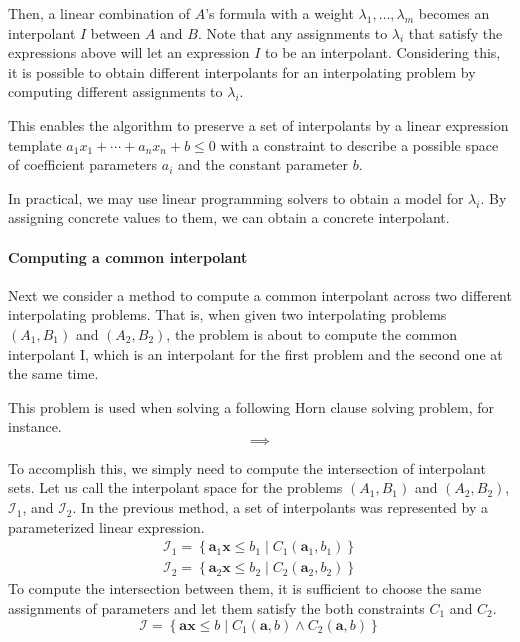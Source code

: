 Then, a linear combination of $A$'s formula with a weight $\lambda_1,
\ldots, \lambda_m$ becomes an interpolant $I$ between $A$ and $B$.
Note that any assignments to $\lambda_i$ that satisfy the expressions
above will let an expression $I$ to be an interpolant.  Considering
this, it is possible to obtain different interpolants for an
interpolating problem by computing different assignments to
$\lambda_i$.

This enables the algorithm to preserve a set of interpolants by a
linear expression template $a_1 x_1 + \cdots + a_n x_n + b \leq 0$
with a constraint to describe a possible space of coefficient
parameters $a_i$ and the constant parameter $b$.

In practical, we may use linear programming solvers to obtain a model
for $\lambda_i$.  By assigning concrete values to them, we can obtain
a concrete interpolant.


\paragraph{Computing a common interpolant}
Next we consider a method to compute a common interpolant across two
different interpolating problems.  That is, when given two
interpolating problems $\left(A_1, B_1 \right)$ and $\left(A_2, B_2
\right)$, the problem is about to compute the common interpolant I,
which is an interpolant for the first problem and the second one at
the same time.

This problem is used when solving a following Horn clause solving
problem, for instance.
\[
\implies
\]

To accomplish this, we simply need to compute the intersection of
interpolant sets.  Let us call the interpolant space for the problems
$\left(A_1, B_1 \right)$ and $\left(A_2, B_2 \right)$,
$\mathcal{I}_1$, and $\mathcal{I}_2$.  In the previous method, a set
of interpolants was represented by a parameterized linear expression.
\begin{align*}
\mathcal{I}_1 = \left\lbrace \mathbf{a}_1 \mathbf{x} \leq b_1 \mid
C_1 (\mathbf{a}_1, b_1 ) \right\rbrace \\
\mathcal{I}_2 = \left\lbrace \mathbf{a}_2 \mathbf{x} \leq b_2 \mid
C_2 (\mathbf{a}_2, b_2 ) \right\rbrace
\end{align*}
To compute the intersection between them, it is sufficient to choose
the same assignments of parameters and let them satisfy the both
constraints $C_1$ and $C_2$.
\[ \mathcal{I} = \left\lbrace \mathbf{a} \mathbf{x} \leq b \mid
C_1(\mathbf{a}, b) \wedge C_2(\mathbf{a}, b) \right\rbrace \]

